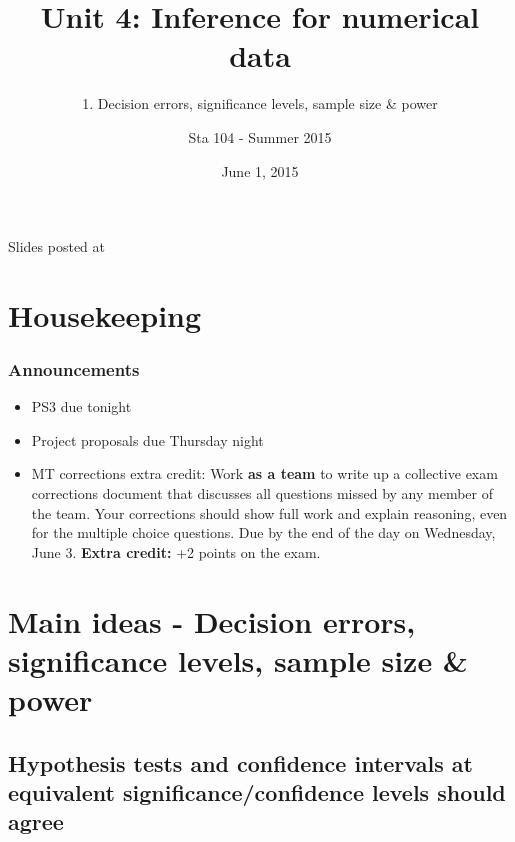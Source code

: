 \documentclass[11pt,containsverbatim,handout,xcolor=xelatex,dvipsnames,table]{beamer}
\title{Unit 4: Inference for numerical data}
\subtitle{1. Decision errors, significance levels, sample size \& power}
\author{Sta 104 - Summer 2015}
\date{June 1, 2015}
\institute{Duke University, Department of Statistical Science}
\begin{document}



\begin{frame}[plain]

\titlepage
\vfill
{\scriptsize {} \hfill Slides posted at  \webLink{\CourseSite}{\CourseSite}}
\addtocounter{framenumber}{-1} 

\end{frame}


\section{Housekeeping}


\begin{frame}
\frametitle{Announcements}

\begin{itemize}

\item PS3 due tonight

\item Project proposals due Thursday night

\item MT corrections extra credit: Work \textbf{as a team} to write up a collective exam corrections document that discusses all questions missed by any member of the team. Your corrections should show full work and explain reasoning, even for the multiple choice questions. Due by the end of the day on Wednesday, June 3. \textbf{Extra credit:} +2 points on the exam.

\end{itemize}

\end{frame}


\section{Main ideas - Decision errors, significance levels, sample size \& power}


\subsection{Hypothesis tests and confidence intervals at equivalent significance/confidence levels should agree}
\label{mi1dec}
\end{document}
